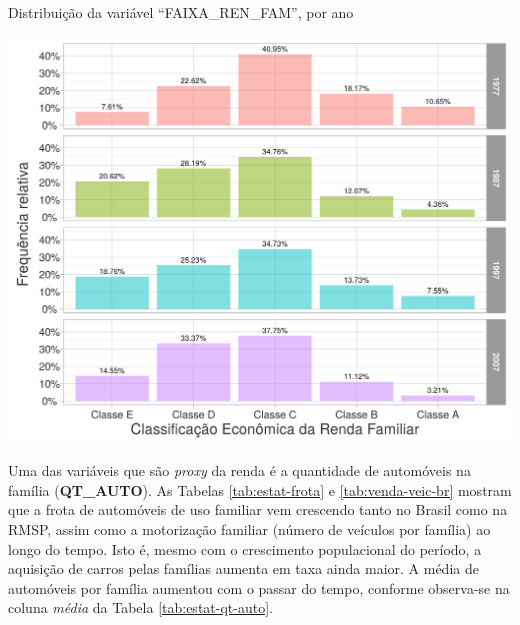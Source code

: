 \begin{grafico}[htb]%
    \caption{\label{graf:class-econ-ren-fam}Distribuição da variável ``FAIXA_REN_FAM'', por ano}%
    \begin{center}%
        \includegraphics[width=1\textwidth]{./imagens/class-econ-ren-fam.png}%
    \end{center}%
\end{grafico}%

Uma das variáveis que são \textit{proxy} da renda é a quantidade de automóveis na família (\textbf{QT_AUTO}).
As Tabelas \ref{tab:estat-frota} e \ref{tab:venda-veic-br} mostram que a frota de automóveis de uso familiar vem crescendo tanto no Brasil como na RMSP, assim como a motorização familiar (número de veículos por família) ao longo do tempo. Isto é, mesmo com o crescimento populacional do período, a aquisição de carros pelas famílias aumenta em taxa ainda maior.
A média de automóveis por família aumentou com o passar do tempo, conforme observa-se na coluna \textit{média} da Tabela \ref{tab:estat-qt-auto}.

